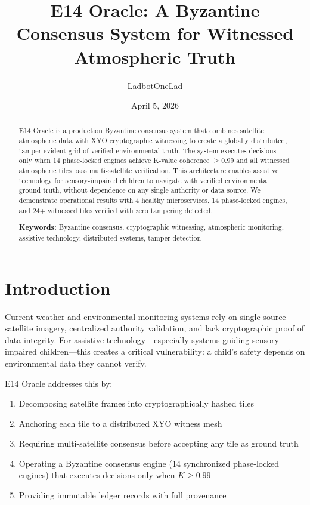 \documentclass[11pt]{article}
\title{E14 Oracle: A Byzantine Consensus System for Witnessed Atmospheric Truth}
\author{LadbotOneLad}
\date{April 5, 2026}
\begin{document}
\maketitle

\begin{abstract}
E14 Oracle is a production Byzantine consensus system that combines satellite atmospheric data with XYO cryptographic witnessing to create a globally distributed, tamper-evident grid of verified environmental truth. The system executes decisions only when 14 phase-locked engines achieve K-value coherence $\geq 0.99$ and all witnessed atmospheric tiles pass multi-satellite verification. This architecture enables assistive technology for sensory-impaired children to navigate with verified environmental ground truth, without dependence on any single authority or data source. We demonstrate operational results with 4 healthy microservices, 14 phase-locked engines, and 24+ witnessed tiles verified with zero tampering detected.

\textbf{Keywords:} Byzantine consensus, cryptographic witnessing, atmospheric monitoring, assistive technology, distributed systems, tamper-detection
\end{abstract}

\section{Introduction}

Current weather and environmental monitoring systems rely on single-source satellite imagery, centralized authority validation, and lack cryptographic proof of data integrity. For assistive technology---especially systems guiding sensory-impaired children---this creates a critical vulnerability: a child's safety depends on environmental data they cannot verify.

E14 Oracle addresses this by:
\begin{enumerate}
    \item Decomposing satellite frames into cryptographically hashed tiles
    \item Anchoring each tile to a distributed XYO witness mesh
    \item Requiring multi-satellite consensus before accepting any tile as ground truth
    \item Operating a Byzantine consensus engine (14 synchronized phase-locked engines) that executes decisions only when $K \geq 0.99$
    \item Providing immutable ledger records with full provenance
\end{enumerate}
\end{document}
